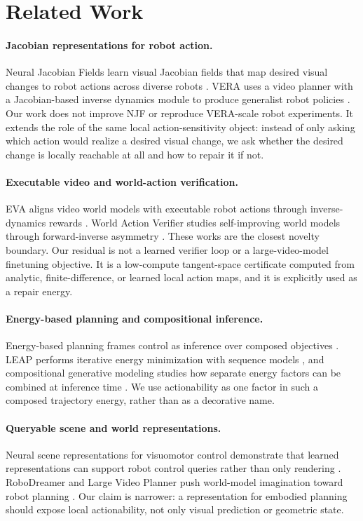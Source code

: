 \section{Related Work}

\paragraph{Jacobian representations for robot action.}
Neural Jacobian Fields learn visual Jacobian fields that map desired visual changes to robot actions across diverse robots \citep{li2024jacobian}. VERA uses a video planner with a Jacobian-based inverse dynamics module to produce generalist robot policies \citep{li2026vera}. Our work does not improve NJF or reproduce VERA-scale robot experiments. It extends the role of the same local action-sensitivity object: instead of only asking which action would realize a desired visual change, we ask whether the desired change is locally reachable at all and how to repair it if not.

\paragraph{Executable video and world-action verification.}
EVA aligns video world models with executable robot actions through inverse-dynamics rewards \citep{wang2026eva}. World Action Verifier studies self-improving world models through forward-inverse asymmetry \citep{liu2026wav}. These works are the closest novelty boundary. Our residual is not a learned verifier loop or a large-video-model finetuning objective. It is a low-compute tangent-space certificate computed from analytic, finite-difference, or learned local action maps, and it is explicitly used as a repair energy.

\paragraph{Energy-based planning and compositional inference.}
Energy-based planning frames control as inference over composed objectives \citep{du2019planning}. LEAP performs iterative energy minimization with sequence models \citep{chen2023leap}, and compositional generative modeling studies how separate energy factors can be combined at inference time \citep{du2024compositional}. We use actionability as one factor in such a composed trajectory energy, rather than as a decorative name.

\paragraph{Queryable scene and world representations.}
Neural scene representations for visuomotor control demonstrate that learned representations can support robot control queries rather than only rendering \citep{li20213d}. RoboDreamer and Large Video Planner push world-model imagination toward robot planning \citep{zhou2024robodreamer,chen2025lvp}. Our claim is narrower: a representation for embodied planning should expose local actionability, not only visual prediction or geometric state.

